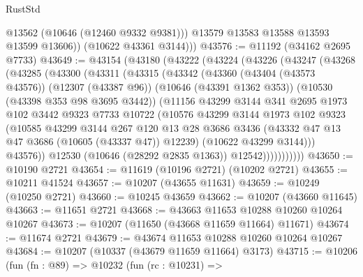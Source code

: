\begin{lexlean}{RustStd}
\begin{coremodule}
              @13562
              (@10646 (@12460 @9332 @9381)))
            @13579
            @13583
            @13588
            @13593
            @13599
            @13606))
        (@10622 @43361 @3144)))
@43576 := @11192 (@34162 @2695 @7733)
@43649 := @43154
    (@43180
      (@43222
        (@43224
          (@43226
            (@43247
              (@43268
                (@43285
                  (@43300
                    (@43311
                      (@43315
                        (@43342
                          (@43360
                            (@43404 (@43573 @43576))
                            (@12307 (@43387 @96))
                            (@10646 (@43391 @1362 @353))
                            (@10530 (@43398 @353 @98 @3695 @3442))
                            (@11156
                              @43299
                              @3144
                              @341
                              @2695
                              @1973
                              @102
                              @3442
                              @9323
                              @7733
                              @10722
                              (@10576
                                @43299
                                @3144
                                @1973
                                @102
                                @9323
                                (@10585
                                  @43299
                                  @3144
                                  @267
                                  @120
                                  @13
                                  @28
                                  @3686
                                  @3436
                                  (@43332 @47 @13 @47 @3686 (@10605 (@43337 @47)) @12239)
                                  (@10622 @43299 @3144)))
                              @43576))
                          @12530
                          (@10646 (@28292 @2835 @1363))
                          @12542)))))))))))
@43650 := @10190 @2721
@43654 := @11619 (@10196 @2721) (@10202 @2721)
@43655 := @10211 @41524
@43657 := @10207 (@43655 @11631)
@43659 := @10249 (@10250 @2721)
@43660 := @10245 @43659
@43662 := @10207 (@43660 @11645)
@43663 := @11651 @2721
@43668 := @43663 @11653 @10288 @10260 @10264 @10267
@43673 := @10207 (@11650 (@43668 @11659 @11664) @11671)
@43674 := @11674 @2721
@43679 := @43674 @11653 @10288 @10260 @10264 @10267
@43684 := @10207 (@10337 (@43679 @11659 @11664) @3173)
@43715 := @10206
    (fun (fn : @89) =>
    @10232
      (fun (rc : @10231) =>

\end{coremodule}
\end{lexlean}
